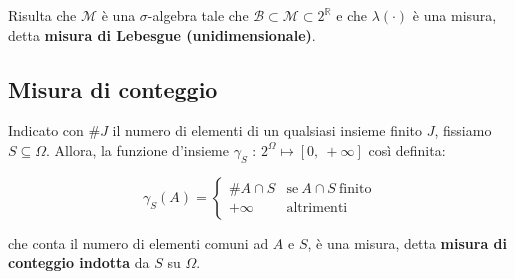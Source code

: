 \documentclass[a4paper,11pt]{article}
\theoremstyle{plain}
\theoremstyle{definition}
\theoremstyle{remark}
\begin{document}
Risulta che $\mathcal{M}$ è una $\sigma$-algebra tale che $\mathcal{B}\subset \mathcal{M} \subset 2^{\mathbb{R}}$ e che  $\lambda(\cdot)$ è una misura, detta \textbf{misura di Lebesgue (unidimensionale)}.

\subsection{Misura di conteggio}
Indicato con $\# J$ il numero di elementi di un qualsiasi insieme finito $J$, fissiamo $ S\subseteq\Omega$. Allora, la funzione d'insieme $\gamma_{S}$ : $2^{\Omega}\mapsto[0,\ +\infty]$ così definita:

$$\gamma_{S}(A)=\left\{\begin{array}{ll}
\# A\cap S & \mathrm{s}\mathrm{e}\ A\cap S\ \mathrm{f}\mathrm{i}\mathrm{n}\mathrm{i}\mathrm{t}\mathrm{o}\\
+\infty & \mathrm{a}\mathrm{l}\mathrm{t}\mathrm{r}\mathrm{i}\mathrm{m}\mathrm{e}\mathrm{n}\mathrm{t}\mathrm{i}\ 
\end{array}\right.$$

che conta il numero di elementi comuni ad $A$ e $S$, è una misura, detta \textbf{ misura di conteggio indotta} da $S$ su $\Omega$.
\end{document}
